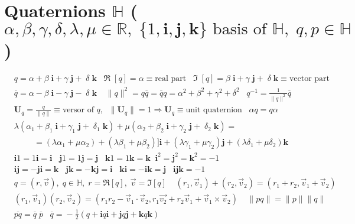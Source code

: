 \section*{Quaternions $\mathbb{H}$\normalfont\scriptsize{ ($\alpha, \beta, \gamma, \delta, \lambda  , \mu \in \mathbb{R}, \;\{1,\mathbf{i},\mathbf{j},\mathbf{k}\} \text{ basis of } \mathbb{H}, \; q,p \in \mathbb{H}$)}}
\begin{align*}
&q = \alpha+ \beta \; \!\mathbf{i} + \gamma \; \! \mathbf{j} + \; \! \delta \; \! \mathbf{k} \; \; \; \Re\;\![q] \!=\!\alpha \!\equiv\! \text{real part} \; \; \; \Im \; \![q]\!=\!\beta \; \!\mathbf{i}  + \gamma \; \! \mathbf{j} + \; \! \delta \; \! \mathbf{k}\!\equiv \!\text{vector part}\\
&\overline{q}=\alpha- \beta \; \!\mathbf{i} - \gamma \; \! \mathbf{j} - \; \! \delta \; \! \mathbf{k} \; \; \; \ \|q\|^2=q\overline{q}=\overline{q}q =\alpha ^2 +\beta ^2 + \gamma ^2 + \delta ^2  \;\;\; q^{-1}= \frac{1}{\|q\|^2}\overline{q}\\
& \mathbf{U}_q = \frac{q}{\|q\|} \equiv \text{versor of }q, \; \; \|\mathbf{U}_q\|=1 \Rightarrow \mathbf{U}_q\equiv \text{unit quaternion}\; \; \; \alpha q = q\alpha \\
& \lambda (\alpha_1+ \beta_1 \; \!\mathbf{i} + \gamma_1 \; \! \mathbf{j} + \; \! \delta_1 \; \! \mathbf{k} ) + \mu (\alpha_2+ \beta_2 \; \!\mathbf{i} + \gamma_2\; \! \mathbf{j} + \; \! \delta_2 \; \! \mathbf{k}) = \\
&\hspace{1cm}=(\lambda\alpha_1+\mu\alpha_2) + (\lambda\beta_1+\mu\beta_2)]\mathbf{i}+(\lambda\gamma_1+\mu\gamma_2)\mathbf{j}+(\lambda\delta_1+\mu\delta_2)\mathbf{k}\\
&\mathbf{i}1 = 1\mathbf{i} = \mathbf{i}\; \; \; \mathbf{j}1=1\mathbf{j} = \mathbf{j}\; \; \;  \mathbf{k}1=1\mathbf{k}=\mathbf{k}\; \; \mathbf{i}^2 = \mathbf{j}^2=\mathbf{k}^2 = -1\\
&\mathbf{ij}=-\mathbf{ji}=\mathbf{k}\;\; \; \mathbf{jk}=-\mathbf{kj}=\mathbf{i} \; \; \; \mathbf{ki}=-\mathbf{ik}=\mathbf{j}\;\; \; \mathbf{ijk} = -1 \\
& q = (r,\vec{v}), \;\! q\in \mathbb{H},\;\! r = \Re [q], \;\!\vec{v} = \Im [q]\;\; \; \; 
(r_1,\vec{v}_1)+(r_2,\vec{v}_2) = (r_1+r_2,\vec{v}_1+\vec{v}_2)\\
&(r_1,\vec{v}_1)(r_2,\vec{v}_2) = (r_1r_2-\vec{v}_1\cdot \vec{v}_2, r_1\vec{v_2}+r_2\vec{v}_1+\vec{v}_1\times \vec{v}_2)\;\;\;\; \|pq\|=\|p\|\|q\|\\
&\overline{pq} = \overline{q} \;\overline{p}\; \; \; \overline{q}\!= \!-\tfrac{1}{2}(q+\mathbf{i}q\mathbf{i}+\mathbf{j}q\mathbf{j}+\mathbf{k}q\mathbf{k})\; \; \; 

\end{align*}
